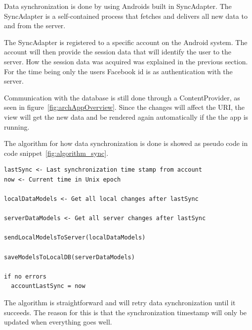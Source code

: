 Data synchronization is done by using Androids built in SyncAdapter. The SyncAdapter is a self-contained process that fetches and delivers all new data to and from the server. 

The SyncAdapter is registered to a specific account on the Android system. The account will then provide the session data that will identify the user to the server. How the session data was acquired was explained in the previous section. For the time being only the users Facebook id is as authentication with the server. 


Communication with the database is still done through a ContentProvider, as seen in figure~\ref{fig:archAppOverview}. Since the changes will affect the URI, the view will get the new data and be rendered again automatically if the the app is running.

The algorithm for how data synchronization is done is showed as pseudo code in code snippet~\ref{fig:algorithm_sync}.\\


\noindent\begin{minipage}{\textwidth}
\begin{lstlisting}[caption={Algorithm for the synchronization flow}, label={fig:algorithm_sync}]
lastSync <- Last synchronization time stamp from account
now <- Current time in Unix epoch

localDataModels <- Get all local changes after lastSync

serverDataModels <- Get all server changes after lastSync

sendLocalModelsToServer(localDataModels)

saveModelsToLocalDB(serverDataModels)

if no errors
  accountLastSync = now
\end{lstlisting}
\end{minipage}

The algorithm is straightforward and will retry data synchronization until it succeeds. The reason for this is that the synchronization timestamp will only be updated when everything goes well. 


